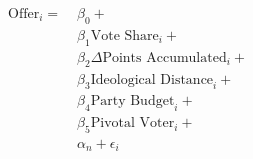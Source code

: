 \begin{equation}\label{eq:ols}
\begin{aligned}
\text{Offer}_{i} = \; & \beta_{0} + \\
                & \beta_{1}\text{Vote Share}_{i} + \\
                & \beta_{2}\Delta\text{Points Accumulated}_{i} + \\
                & \beta_{3}\text{Ideological Distance}_{i} + \\
                & \beta_{4}\text{Party Budget}_{i} + \\
                & \beta_{5}\text{Pivotal Voter}_{i} + \\
                & \alpha_{n} + \epsilon_{i}
\end{aligned}
\end{equation}
